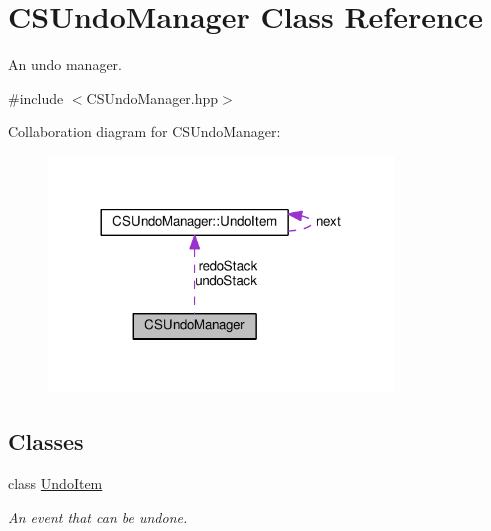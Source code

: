 \hypertarget{classCSUndoManager}{}\section{C\+S\+Undo\+Manager Class Reference}
\label{classCSUndoManager}


An undo manager.  




{\ttfamily \#include $<$C\+S\+Undo\+Manager.\+hpp$>$}



Collaboration diagram for C\+S\+Undo\+Manager\+:
\nopagebreak
\begin{figure}[H]
\begin{center}
\leavevmode
\includegraphics[width=260pt]{classCSUndoManager__coll__graph}
\end{center}
\end{figure}
\subsection*{Classes}
\begin{DoxyCompactItemize}
\item 
class \hyperlink{classCSUndoManager_1_1UndoItem}{Undo\+Item}
\begin{DoxyCompactList}\small\item\em An event that can be undone. \end{DoxyCompactList}\end{DoxyCompactItemize}
